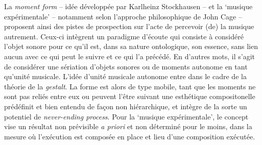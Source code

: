 \documentclass{article}
\begin{document}
La \textsl{moment form} -- idée développée par Karlheinz Stockhausen -- et la `musique expérimentale' -- notamment selon l'approche philosophique de John Cage -- proposent ainsi des pistes de prospection sur l'acte de percevoir (de) la musique autrement. Ceux-ci intègrent un paradigme d'écoute qui consiste à considéré l'objet sonore pour ce qu'il est, dans sa nature ontologique, son essence, sans lien aucun %
avec ce qui peut le suivre et ce qui l'a précédé. 
En d'autres mots, il s'agit de considérer une sériation d'objets sonores ou de moments %
autonome en tant qu'unité musicale. %
L'idée d'unité musicale autonome entre dans le cadre de la théorie de la \textit{gestalt}\label{efn:gestalt}. %
La forme est alors de type mobile, tant que les moments ne sont pas reliés entre eux ou peuvent l'être suivant une esthétique compositonelle prédéfinit et bien entendu de façon non hiérarchique, et intègre de la sorte un potentiel de \textsl{never-ending process}.
Pour la `musique expérimentale', le concept vise un résultat non prévisible \textit{a priori} et non déterminé pour le moins, dans la mesure où l'exécution est composée en place et lieu d'une composition exécutée. %
\end{document}
